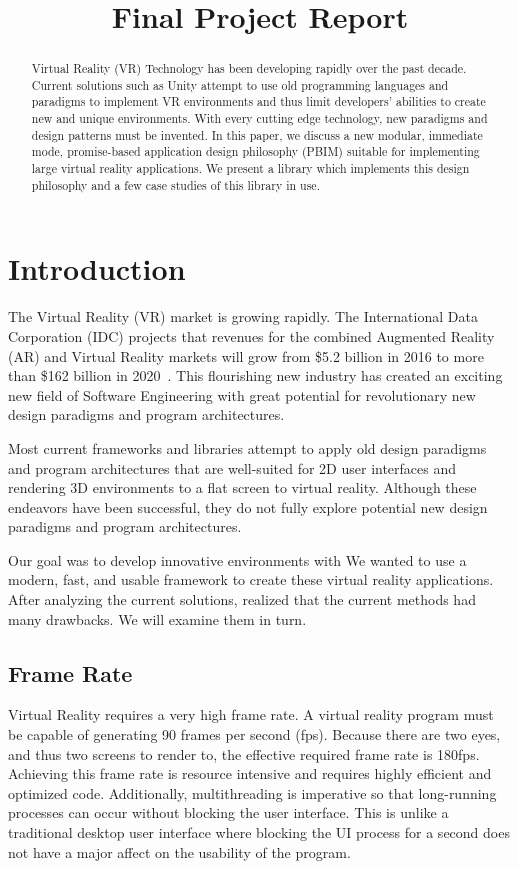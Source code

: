 \documentclass[conference,12pt]{IEEEtran}
\title{Final Project Report}
\author{%
    \IEEEauthorblockN{%
        Jonathan Sumner Evans\IEEEauthorrefmark{1},
        Robinson Merillat\IEEEauthorrefmark{2}, and
        Sam Sartor\IEEEauthorrefmark{3}
    }
    \IEEEauthorblockA{%
        Department of Computer Science,
        Colorado School of Mines\\
        Golden, Colorado\\
        Email:
            \IEEEauthorrefmark{1}jonathanevans@mines.edu,
            \IEEEauthorrefmark{2}rdmerillat@mines.edu,
            \IEEEauthorrefmark{3}ssartor@mines.edu
    }
}
\begin{document}
\maketitle

\begin{abstract}
    Virtual Reality (VR) Technology has been developing rapidly over the past
    decade. Current solutions such as Unity attempt to use old programming
    languages and paradigms to implement VR environments and thus limit
    developers' abilities to create new and unique environments. With every
    cutting edge technology, new paradigms and design patterns must be invented.
    In this paper, we discuss a new modular, immediate mode, promise-based
    application design philosophy (PBIM) suitable for implementing large virtual
    reality applications. We present a library which implements this design
    philosophy and a few case studies of this library in use.
\end{abstract}

\section{Introduction}
The Virtual Reality (VR) market is growing rapidly. The International Data
Corporation (IDC) projects that revenues for the combined Augmented Reality (AR)
and Virtual Reality markets will grow from \$5.2 billion in 2016 to more than
\$162 billion in 2020~\cite{IDC:2016:VR-industry}. This flourishing new industry
has created an exciting  new field of Software Engineering with great potential
for revolutionary new design paradigms and program architectures.

Most current frameworks and libraries attempt to apply old design paradigms and
program architectures that are well-suited for 2D user interfaces and rendering
3D environments to a flat screen to virtual reality. Although these endeavors
have been successful, they do not fully explore potential new design paradigms
and program architectures.

Our goal was to develop innovative environments with %
We wanted to use a modern, fast, and usable framework to create these virtual
reality applications. After analyzing the current solutions, realized that the
current methods had many drawbacks. We will examine them in turn.

\subsection{Frame Rate}
Virtual Reality requires a very high frame rate. A virtual reality program must
be capable of generating 90 frames per second (fps). Because there are two eyes,
and thus two screens to render to, the effective required frame rate is 180fps.
Achieving this frame rate is resource intensive and requires highly efficient
and optimized code. Additionally, multithreading is imperative so that
long-running processes can occur without blocking the user interface. This is
unlike a traditional desktop user interface where blocking the UI process for a
second does not have a major affect on the usability of the program.
\end{document}
